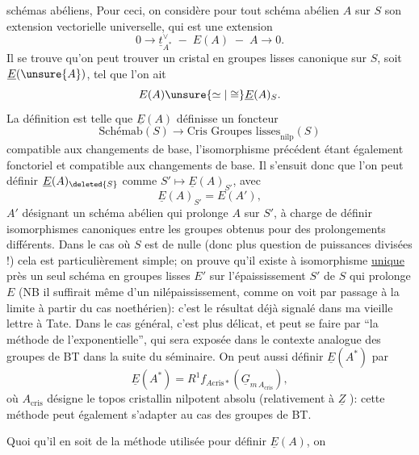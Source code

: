 schémas abéliens,  Pour ceci, on considère pour tout schéma abélien $A$ sur $S$ son extension vectorielle universelle, qui est une extension
\[
0\longrightarrow\underline t_{A^*}^{\vee}\;-\;E(A)\;-\;A\longrightarrow0.
\]
Il se trouve qu'on peut trouver un cristal en groupes lisses canonique sur $S$, soit $\underline E(\unsure{A})$, tel que l'on ait
\[
E(A)\unsure{\simeq|\cong}\underline E(A)_S.
\]
La définition est telle que  $\underline E(A)$ définisse un foncteur
\[
\text{Schémab}(S)\longrightarrow\text{Cris Groupes lisses}_{\mathrm{nilp}}(S)
\]
compatible aux changements de base, l'isomorphisme précédent étant également fonctoriel et compatible aux changements de base. Il s'ensuit donc que l'on peut définir $\underline E(A)_{\deleted{S}}$ comme $S'\mapsto\underline E(A)_{S'}$, avec
\[
\underline E(A)_{S'}=E(A'),
\]
$A'$ désignant un schéma abélien qui prolonge $A$ sur $S'$,  à charge de définir  isomorphismes canoniques entre les groupes obtenus pour des prolongements différents. Dans le cas où $S$ est de  nulle (donc plus question de puissances divisées !) cela est particulièrement simple; on prouve qu'il existe à isomorphisme \uline{unique} près un seul schéma en groupes lisses $E'$ sur l'épaississement $S'$ de $S$ qui prolonge $E$ (NB il suffirait même d'un nilépaississement, comme on voit par passage à la limite à partir du cas noethérien): c'est le résultat déjà signalé dans ma vieille lettre à Tate. Dans le cas général, c'est plus délicat, et peut se faire par ``la méthode de l'exponentielle'', qui sera exposée dans le contexte analogue des groupes de BT dans la suite du séminaire. On peut aussi définir $\underline E(A^*)$ par
\[
\underline E(A^*)=R^1f_{A\mathrm{cris}*}(\underline G_{m\,A_{\mathrm{cris}}}),
\]
où $A_{\mathrm{cris}}$ désigne le topos cristallin  nilpotent absolu (relativement à $\underline Z$ ): cette méthode peut également s'adapter au cas des groupes de BT.

Quoi qu'il en soit de la méthode utilisée pour définir $\underline E(A)$, on
